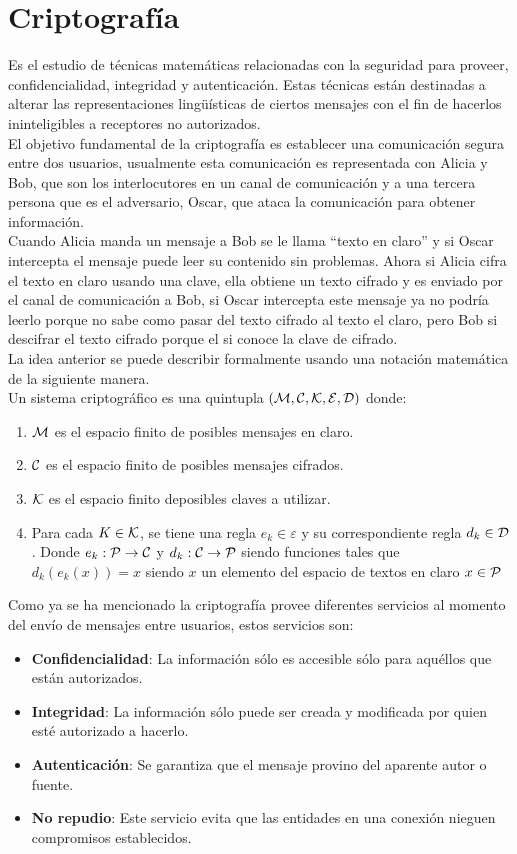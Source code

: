 \documentclass[12pt,oneside,onecolumn,openany]{report}
\begin{document}
\section{Criptografía}
Es el estudio de técnicas matemáticas relacionadas con la seguridad para proveer, confidencialidad, integridad y autenticación. Estas técnicas están destinadas a alterar las representaciones lingüísticas de ciertos mensajes con el fin de hacerlos ininteligibles a receptores no autorizados.\cite{cri}
\\
El objetivo fundamental de la criptografía es establecer una comunicación segura entre dos usuarios, usualmente esta comunicación es representada con Alicia y Bob, que son los interlocutores en un canal de comunicación y a una tercera persona que es el adversario, Oscar, que ataca la comunicación para obtener información. \\
Cuando Alicia manda un mensaje a Bob se le llama “texto en claro” y si Oscar intercepta el mensaje puede leer su contenido sin problemas. Ahora si Alicia cifra el texto en claro usando una clave, ella obtiene un texto cifrado y es enviado por el canal de comunicación a Bob, si Oscar intercepta este mensaje ya no podría leerlo porque no sabe como pasar del texto cifrado al texto el claro, pero Bob si descifrar el texto cifrado porque el si conoce la clave de cifrado.\cite{stin}\\
La idea anterior se puede describir formalmente usando una notación matemática de la siguiente manera.\\
Un sistema criptográfico es una quintupla $(\cal M,C,K,E,D)$ donde:
\begin{enumerate}
 \item $\cal M$ es el espacio finito de posibles mensajes en claro.
 \item $\cal C$ es el espacio finito de posibles mensajes cifrados.
 \item $\cal K$ es el espacio finito deposibles claves a utilizar.
 \item Para cada $K \in \cal K$, se tiene una regla $e_k\in \varepsilon$ y su correspondiente regla $d_k\in \cal D$. Donde $e_k :\cal P\rightarrow C$ y $d_k:\cal C\rightarrow P$ siendo funciones tales que $d_k(e_k(x))=x$ siendo $x$ un elemento del espacio de textos en claro $x\in\cal P$
\end{enumerate}

Como ya se ha mencionado la criptografía provee diferentes servicios al momento del  envío de mensajes entre usuarios, estos servicios son:\\
\begin{itemize}
 \item \textbf{Confidencialidad}:  La  información  sólo es  accesible  sólo  para  aquéllos  que  están autorizados.
 \item \textbf{Integridad}:  La información sólo puede ser creada y modificada por quien esté autorizado a hacerlo.
 \item \textbf{Autenticación}: Se garantiza que el mensaje provino del aparente autor o fuente.
 \item \textbf{No repudio}:  Este servicio evita que las entidades en una conexión nieguen compromisos establecidos.
\end{itemize}
\end{document}
